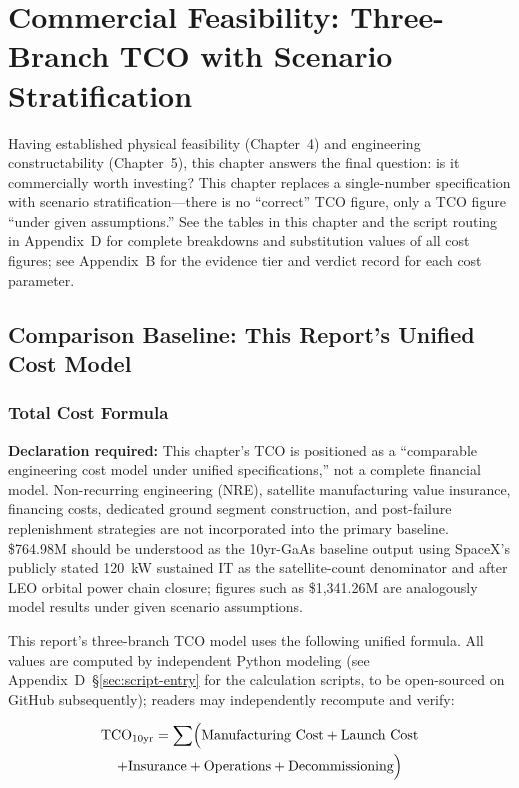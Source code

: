 
\section{Commercial Feasibility: Three-Branch TCO with Scenario Stratification}

Having established physical feasibility (Chapter~4) and engineering constructability (Chapter~5), this chapter answers the final question: is it commercially worth investing? This chapter replaces a single-number specification with scenario stratification---there is no ``correct'' TCO figure, only a TCO figure ``under given assumptions.'' See the tables in this chapter and the script routing in Appendix~D for complete breakdowns and substitution values of all cost figures; see Appendix~B for the evidence tier and verdict record for each cost parameter.

\subsection{Comparison Baseline: This Report's Unified Cost Model}

\subsubsection{Total Cost Formula}

\noindent\textbf{Declaration required:} This chapter's TCO is positioned as a ``comparable engineering cost model under unified specifications,'' not a complete financial model. Non-recurring engineering (NRE), satellite manufacturing value insurance, financing costs, dedicated ground segment construction, and post-failure replenishment strategies are not incorporated into the primary baseline. \$764.98M should be understood as the 10yr-GaAs baseline output using SpaceX's publicly stated 120~kW sustained IT as the satellite-count denominator and after LEO orbital power chain closure; figures such as \$1,341.26M are analogously model results under given scenario assumptions.

This report's three-branch TCO model uses the following unified formula. All values are computed by independent Python modeling (see Appendix~D~\S\ref{sec:script-entry} for the calculation scripts, to be open-sourced on GitHub subsequently); readers may independently recompute and verify:

\begin{multline}
\text{TCO}_{10\text{yr}} = \sum \Bigl(\text{Manufacturing Cost} + \text{Launch Cost} \\
+ \text{Insurance} + \text{Operations} + \text{Decommissioning}\Bigr)
\end{multline}

